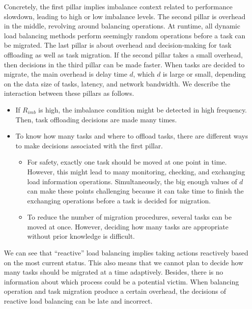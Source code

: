 Concretely, the first pillar implies imbalance context related to performance slowdown, leading to high or low imbalance levels. The second pillar is overhead in the middle, revolving around balancing operations. At runtime, all dynamic load balancing methods perform seemingly random operations before a task can be migrated. The last pillar is about overhead and decision-making for task offloading as well as task migration. If the second pillar takes a small overhead, then decisions in the third pillar can be made faster. When tasks are decided to migrate, the main overhead is delay time $d$, which $d$ is large or small, depending on the data size of tasks, latency, and network bandwidth. We describe the interaction between these pillars as follows.
\begin{itemize}
	\item If $R_{imb}$ is high, the imbalance condition might be detected in high frequency. Then, task offloading decisions are made many times.
	\item To know how many tasks and where to offload tasks, there are different ways to make decisions associated with the first pillar.
	\begin{itemize}
		\item For safety, exactly one task should be moved at one point in time. However, this might lead to many monitoring, checking, and exchanging load information operations. Simultaneously, the big enough values of $d$ can make these points challenging because it can take time to finish the exchanging operations before a task is decided for migration.
		\item To reduce the number of migration procedures, several tasks can be moved at once. However, deciding how many tasks are appropriate without prior knowledge is difficult.
	\end{itemize}
\end{itemize}

We can see that ``reactive'' load balancing implies taking actions reactively based on the most current status. This also means that we cannot plan to decide how many tasks should be migrated at a time adaptively. Besides, there is no information about which process could be a potential victim. When balancing operation and task migration produce a certain overhead, the decisions of reactive load balancing can be late and incorrect.\\

